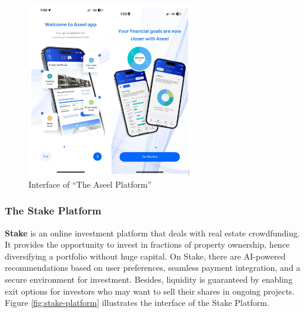 \begin{figure}[htbp]
    \centering
    \includegraphics[width=0.65\textwidth]{images/Interface-of-the Aseel Platform.png}
    \caption{Interface of ``The Aseel Platform''}
    \label{fig:aseel-platform}
\end{figure}

\begin{center}
    \vspace{0.5em}
    \vspace{0.5em}
\end{center}

\subsubsection{The Stake Platform}

\textbf{\textcolor{primary}{Stake}} is an online investment platform that deals with real estate crowdfunding. It provides the opportunity to invest in fractions of property ownership, hence diversifying a portfolio without huge capital. On Stake, there are AI-powered recommendations based on user preferences, seamless payment integration, and a secure environment for investment. Besides, liquidity is guaranteed by enabling exit options for investors who may want to sell their shares in ongoing projects. Figure \ref{fig:stake-platform} illustrates the interface of the Stake Platform.

